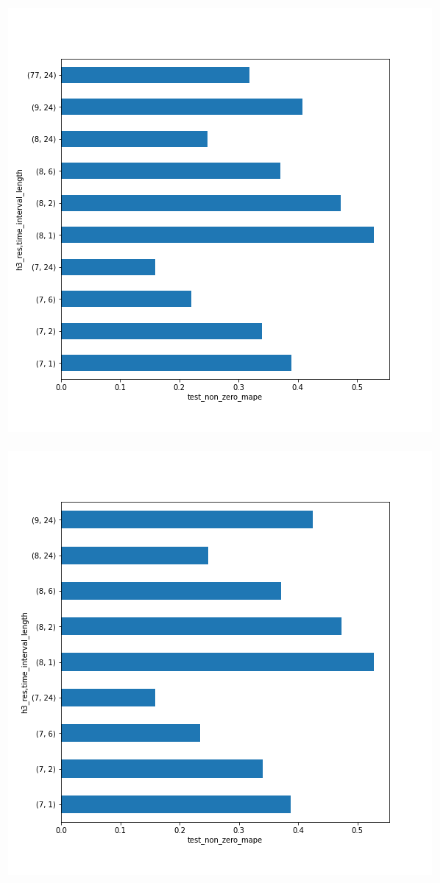 \begin{figure}
\centering
\begin{minipage}{.5\textwidth}
  \centering
  \includegraphics[width=\linewidth]{Figures/predictive_analysis/demand_test_non_zero_mape.png}
  \label{fig:non_zero_mape_demand}
\end{minipage}%
\begin{minipage}{.5\textwidth}
  \centering
  \includegraphics[width=\linewidth]{Figures/predictive_analysis/availability_test_non_zero_mape.png}
  \label{fig:non_zero_mape_availability}
\end{minipage}
\end{figure}
